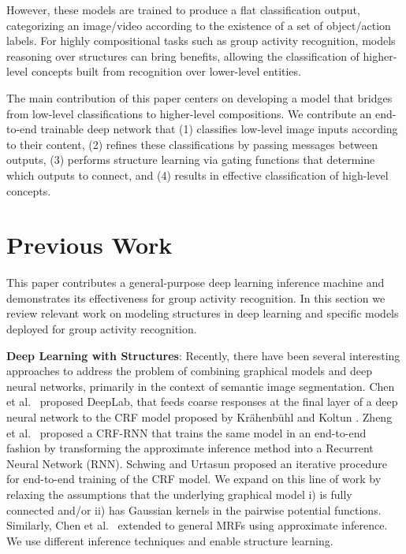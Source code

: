 \documentclass[10pt,twocolumn,letterpaper]{article}
\begin{document}
However, these models are trained to produce a flat classification output, categorizing an image/video according to the existence of a set of object/action labels.  For highly compositional tasks such as group activity recognition, models reasoning over structures can bring benefits, allowing the classification of higher-level concepts built from recognition over lower-level entities.

The main contribution of this paper centers on developing a model that bridges from low-level classifications to higher-level compositions.  We contribute an end-to-end trainable deep network that (1) classifies low-level image inputs according to their content, (2) refines these classifications by passing messages between outputs, (3) performs structure learning via gating functions that determine which outputs to connect, and (4) results in effective classification of high-level concepts.

















\vspace{-2mm}
\section{Previous Work}
\vspace{-1mm}

This paper contributes a general-purpose deep learning inference machine and demonstrates its effectiveness for group activity recognition.  In this section we review relevant work on modeling structures in deep learning and specific models deployed for group activity recognition.



{\bf Deep Learning with Structures}:
Recently, there have been several interesting approaches to address the problem of combining graphical models and deep neural networks, primarily in the context of semantic image segmentation. 
Chen et al.~\cite{ChenPKMY15} proposed DeepLab, that feeds coarse responses at the final layer of a deep neural network to the CRF model proposed by Kr{\"a}henb{\"u}hl and Koltun \cite{KrahenbuhlK11}. 
Zheng et al.~\cite{Zheng15} proposed a CRF-RNN that trains the same model in an end-to-end fashion by transforming the approximate inference method \cite{KrahenbuhlK11} into a Recurrent Neural Network (RNN).
Schwing and Urtasun \cite{schwing2015fully} proposed an iterative procedure for end-to-end training of the CRF model.  We expand on this line of work by relaxing the assumptions that the underlying graphical model i) is fully connected and/or ii) has Gaussian kernels in the pairwise potential functions. Similarly, Chen et al.~\cite{chen2014learning} extended to general MRFs using approximate inference.  We use different inference techniques and enable structure learning.
\end{document}
